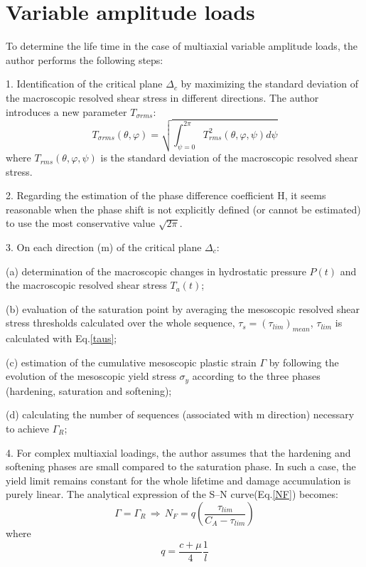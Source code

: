 \documentclass[3p,times,procedia,number]{elsarticle}
\begin{document}
\section{Variable amplitude loads}
To determine the life time in the case of multiaxial variable amplitude loads, the author performs the following steps:
\begin{flushleft}

1. Identification of the critical plane $\Delta_c$ by maximizing the standard deviation of the macroscopic resolved shear stress in different directions. The author introduces a new parameter $T_{\sigma rms}$:
\begin{equation}
T_{\sigma rms}(\theta,\varphi)=\sqrt{\int_{\psi=0}^{2\pi}T_{rms}^2(\theta,\varphi,\psi)d\psi}
	\label{srms}
\end{equation}
where $T_{rms}(\theta,\varphi,\psi)$ is the standard deviation of the macroscopic resolved shear stress.
\vspace{8pt}

2. Regarding the estimation of the phase difference coefficient H, it seems reasonable when the phase shift is not
explicitly defined (or cannot be estimated) to use the
most conservative value $\sqrt{2\pi}$.
\vspace{8pt}

3. On each direction (m) of the critical plane $\Delta_c$:
\vspace{6pt}

(a) determination of the macroscopic changes in hydrostatic pressure $P(t)$ and the macroscopic resolved shear stress $T_a(t)$;
\vspace{6pt}

(b) evaluation of the saturation point by averaging the mesoscopic resolved shear stress thresholds calculated over
the whole sequence, $\tau_{s}=(\tau_{lim})_{mean}$, $\tau_{lim}$ is calculated with Eq.\eqref{taus};
\vspace{6pt}

(c) estimation of the cumulative mesoscopic plastic strain $\Gamma$ by following the evolution of the mesoscopic yield stress $\sigma_y$  according to the three phases (hardening, saturation and softening);
\vspace{6pt}

(d) calculating the number of sequences (associated with m direction) necessary to achieve $\Gamma_R$;
\vspace{6pt}

4.  For complex multiaxial loadings, the author assumes that the hardening
and softening phases are small compared to the saturation phase\cite{Morel2000101}. In such a case, the yield limit remains constant for the whole lifetime and damage accumulation is purely linear. The analytical expression of the S–N curve(Eq.\eqref{NF}) becomes:
\begin{equation}
\Gamma=\Gamma_R \, \Rightarrow \, N_F=q\left(\frac{\tau_{lim}}{C_A-\tau_{lim}}\right)
\label{NFsimple}
\end{equation}
where$$q=\frac{c+\mu}{4}\frac{1}{l}$$


\end{flushleft}
\end{document}
